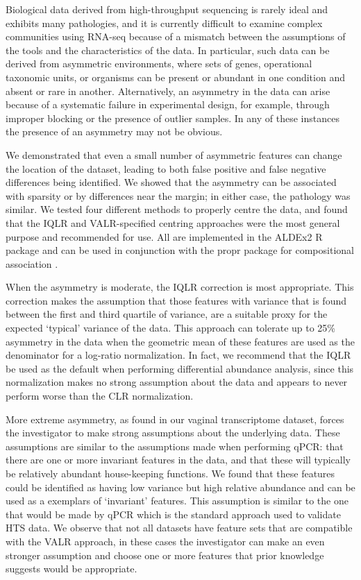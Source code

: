 \documentclass{bmcart}
\begin{document}
Biological data derived from high-throughput sequencing is rarely ideal and exhibits many pathologies, and it is currently difficult to examine complex communities using RNA-seq because of a mismatch between the assumptions of the tools and the characteristics of the data. In particular, such data can be derived from asymmetric environments, where sets of genes, operational taxonomic units, or organisms can be present or abundant in one condition and absent or rare in another. Alternatively, an asymmetry in the data can arise because of a systematic failure in experimental design, for example, through improper blocking or the presence of outlier samples. In any of these instances the presence of an asymmetry may not be obvious. 

We demonstrated that even a small number of asymmetric features can change the location of the dataset, leading to both false positive and false negative differences being identified. We showed that the asymmetry can be associated with sparsity or by differences near the margin; in either case, the pathology was similar. We tested four different methods to properly centre the data, and found that the IQLR and VALR-specified centring approaches were the most general purpose and recommended for use. All are implemented in the ALDEx2 R package and can be used in conjunction with the propr package for compositional association \cite{Quinn:2017}. 

When the asymmetry is moderate, the IQLR correction is most appropriate. This correction makes the assumption that those features with variance that is found between the first and third quartile of variance, are a suitable proxy for the expected `typical' variance of the data. This approach can tolerate up to 25\% asymmetry in the data when the geometric mean of these features are used as the denominator for a log-ratio normalization. In fact, we recommend that the IQLR be used as the default when performing differential abundance analysis, since this normalization makes no strong assumption about the data and appears to never perform worse than the CLR normalization.

More extreme asymmetry, as found in our vaginal transcriptome dataset, forces the investigator to make strong assumptions about the underlying data. These assumptions are similar to the assumptions made when performing qPCR: that there are one or more invariant features in the data, and that these will typically be relatively abundant house-keeping functions. We found that these features could be identified as having low variance but high relative abundance and can be used as a exemplars of `invariant' features. This assumption is similar to the one that would be made by qPCR which is the standard approach used to validate HTS data. We observe that not all datasets have feature sets that are compatible with the VALR approach, in these cases the investigator can make an even stronger assumption and choose one or more features that prior knowledge suggests would be appropriate. 
\end{document}
